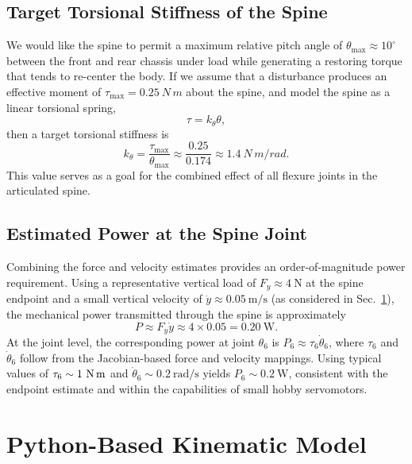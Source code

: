 \documentclass[11pt,letterpaper]{article}
\begin{document}
\subsection{Target Torsional Stiffness of the Spine}

We would like the spine to permit a maximum relative pitch angle of
$\theta_{\max} \approx 10^\circ$ between the front and rear chassis under load
while generating a restoring torque that tends to re-center the body. If we
assume that a disturbance produces an effective moment of
$\tau_{\max} = \SI{0.25}{N\,m}$ about the spine, and model the spine as a
linear torsional spring,
\begin{equation}
    \tau = k_\theta \theta,
\end{equation}
then a target torsional stiffness is
\begin{equation}
    k_\theta = \frac{\tau_{\max}}{\theta_{\max}}
             \approx \frac{0.25}{0.174}
             \approx \SI{1.4}{N\,m/rad}.
\end{equation}
This value serves as a goal for the combined effect of all flexure joints in
the articulated spine.

\subsection{Estimated Power at the Spine Joint}

Combining the force and velocity estimates provides an order-of-magnitude power requirement.
Using a representative vertical load of $F_y \approx 4~\text{N}$ at the spine endpoint and a small
vertical velocity of $\dot{y} \approx 0.05~\text{m/s}$ (as considered in
Sec.~\ref{sec:python_kinematics}), the mechanical power transmitted through the spine is
approximately
\begin{equation}
    P \approx F_y \dot{y} \approx 4 \times 0.05 = 0.20~\text{W}.
\end{equation}
At the joint level, the corresponding power at joint $\theta_6$ is
$P_6 \approx \tau_6 \dot{\theta}_6$, where $\tau_6$ and $\dot{\theta}_6$ follow from the Jacobian-based
force and velocity mappings. Using typical values of $\tau_6 \sim 1~\text{N\,m}$ and
$\dot{\theta}_6 \sim 0.2~\text{rad/s}$ yields $P_6 \sim 0.2~\text{W}$, consistent with the
endpoint estimate and within the capabilities of small hobby servomotors.

\section{Python-Based Kinematic Model}
\label{sec:python_kinematics}
\end{document}

